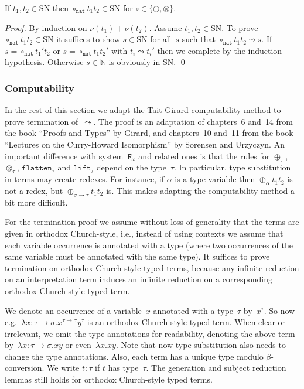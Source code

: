 \documentclass[runningheads,a4paper]{llncs}
\newcommand{\Fomega}{\mathtt{F}_\omega}
\newcommand{\arrtype}{\rightarrow}
\newcommand{\nat}{\mathtt{nat}}
\newcommand{\flatten}{\mathtt{flatten}}
\newcommand{\lift}{\mathtt{lift}}
\newcommand{\SN}{\mathrm{SN}}
\begin{document}
\begin{lemma}\label{lem_circ_sn_base}
  If $t_1,t_2 \in \SN$ then $\circ_\nat t_1 t_2 \in \SN$ for $\circ
  \in \{\oplus,\otimes\}$.
\end{lemma}

\begin{proof}
  By induction on $\nu(t_1) + \nu(t_2)$. Assume $t_1,t_2 \in \SN$. To
  prove $\circ_\nat t_1 t_2 \in \SN$ it suffices to show $s \in \SN$
  for all~$s$ such that $\circ_\nat t_1 t_2 \leadsto s$. If $s =
  \circ_\nat t_1' t_2$ or $s = \circ_\nat t_1 t_2'$ with $t_i \leadsto
  t_i'$ then we complete by the induction hypothesis. Otherwise $s \in
  \mathbb{N}$ is obviously in $\SN$.  \qed
\end{proof}

\subsubsection{Computability}

In the rest of this section we adapt the Tait-Girard computability
method to prove termination of~$\leadsto$. The proof is an adaptation
of chapters~6 and~14 from the book ``Proofs and Types'' by Girard, and
chapters~10 and~11 from the book ``Lectures on the Curry-Howard
Isomorphism'' by Sorensen and Urzyczyn. An important difference with
system~$\Fomega$ and related ones is that the rules for
$\oplus_\tau$, $\otimes_\tau$, $\flatten_\tau$ and $\lift_\tau$ depend
on the type~$\tau$. In particular, type substitution in terms may
create redexes. For instance, if $\alpha$ is a type variable then
$\oplus_\alpha t_1 t_2$ is not a redex, but
$\oplus_{\sigma\arrtype\tau} t_1 t_2$ is. This makes adapting the
computability method a bit more difficult.

For the termination proof we assume without loss of generality that
the terms are given in orthodox Church-style, i.e., instead of using
contexts we assume that each variable occurrence is annotated with a
type (where two occurrences of the same variable must be annotated
with the same type). It suffices to prove termination on orthodox
Church-style typed terms, because any infinite reduction on an
interpretation term induces an infinite reduction on a corresponding
orthodox Church-style typed term.

We denote an occurrence of a variable~$x$ annotated with a type~$\tau$
by~$x^\tau$. So now e.g.~$\lambda x : \tau\arrtype\sigma
. x^{\tau\arrtype\sigma}y^\tau$ is an orthodox Church-style typed
term. When clear or irrelevant, we omit the type annotations for
readability, denoting the above term by~$\lambda x :
\tau\arrtype\sigma . x y$ or even~$\lambda x . x y$. Note that now
type substitution also needs to change the type annotations. Also,
each term has a unique type modulo $\beta$-conversion. We write $t :
\tau$ if $t$ has type~$\tau$. The generation and subject reduction
lemmas still holds for orthodox Church-style typed terms.
\end{document}
